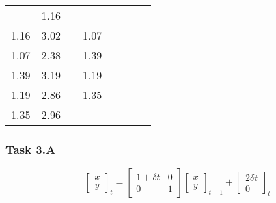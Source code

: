 \documentclass[11pt]{article}
\begin{document}
\begin{longtable}[]{@{}llllllll@{}}
\begin{minipage}[t]{0.10\columnwidth}
\(\begin{array}{cc}0.93 & 1.16\\1.16 & 3.02\end{array}\)\strut
\end{minipage} & \begin{minipage}[t]{0.10\columnwidth}\raggedright
\(\begin{array}{cc}0.88 & 1.07\\1.07 & 2.38\end{array}\)\strut
\end{minipage} & \begin{minipage}[t]{0.10\columnwidth}\raggedright
\(\begin{array}{cc}1.06 & 1.39\\1.39 & 3.19\end{array}\)\strut
\end{minipage} & \begin{minipage}[t]{0.10\columnwidth}\raggedright
\(\begin{array}{cc}0.94 & 1.19\\1.19 & 2.86\end{array}\)\strut
\end{minipage} & \begin{minipage}[t]{0.10\columnwidth}\raggedright
\(\begin{array}{cc}1.07 & 1.35\\1.35 & 2.96\end{array}\)\strut
\end{minipage}\tabularnewline
\bottomrule
\end{longtable}

    \hypertarget{task-3.a}{%
\subsubsection{Task 3.A}\label{task-3.a}}

    \[ \left[\begin{array}{cc}x\\y\end{array} \right]_t = \left[\begin{array}{cc}1+\delta t & 0\\0 & 1\end{array} \right] \left[\begin{array}{cc}x\\y\end{array} \right]_{t-1} + \left[\begin{array}{cc}2\delta t\\0\end{array} \right]_t \]
\end{document}
